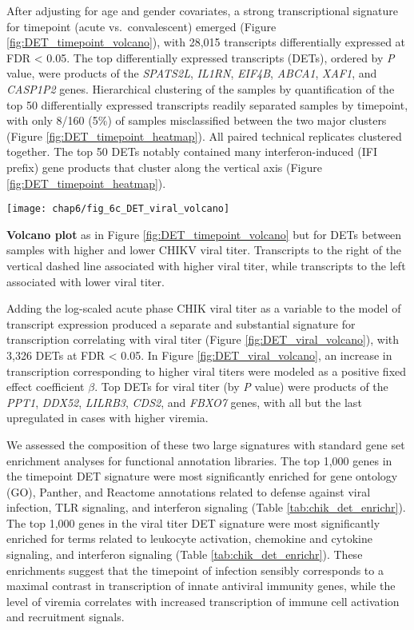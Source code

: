 After adjusting for age and gender covariates, a strong transcriptional signature for timepoint (acute vs.\ convalescent) emerged (Figure \ref{fig:DET_timepoint_volcano}), with 28,015 transcripts differentially expressed at FDR < 0.05. The top differentially expressed transcripts (DETs), ordered by \emph{P} value, were products of the \emph{SPATS2L}, \emph{IL1RN}, \emph{EIF4B}, \emph{ABCA1}, \emph{XAF1}, and \emph{CASP1P2} genes. Hierarchical clustering of the samples by quantification of the top 50 differentially expressed transcripts readily separated samples by timepoint, with only 8/160 (5\%) of samples misclassified between the two major clusters (Figure \ref{fig:DET_timepoint_heatmap}). All paired technical replicates clustered together. The top 50 DETs notably contained many interferon-induced (IFI prefix) gene products that cluster along the vertical axis (Figure \ref{fig:DET_timepoint_heatmap}).

\begin{marginfigure}[-3cm]
  \centering
  \texttt{[image: chap6/fig\_6c\_DET\_viral\_volcano]}
  \caption[Volcano plot of differentially expressed host transcripts for viremic load]{
  \textbf{Volcano plot} as in Figure \ref{fig:DET_timepoint_volcano} but for DETs between samples with higher and lower CHIKV viral titer. Transcripts to the right of the vertical dashed line associated with higher viral titer, while transcripts to the left associated with lower viral titer. 
  }
  \label{fig:DET_viral_volcano}
\end{marginfigure}

Adding the log-scaled acute phase CHIK viral titer as a variable to the model of transcript expression produced a separate and substantial signature for transcription correlating with viral titer (Figure \ref{fig:DET_viral_volcano}), with 3,326 DETs at FDR < 0.05. In Figure \ref{fig:DET_viral_volcano}, an increase in transcription corresponding to higher viral titers were modeled as a positive fixed effect coefficient $\beta$. Top DETs for viral titer (by \emph{P} value) were products of the \emph{PPT1}, \emph{DDX52}, \emph{LILRB3}, \emph{CDS2}, and \emph{FBXO7} genes, with all but the last upregulated in cases with higher viremia.

We assessed the composition of these two large signatures with standard gene set enrichment analyses for functional annotation libraries. The top 1,000 genes in the timepoint DET signature were most significantly enriched for gene ontology (GO), Panther, and Reactome annotations related to defense against viral infection, TLR signaling, and interferon signaling (Table \ref{tab:chik_det_enrichr}). The top 1,000 genes in the viral titer DET signature were most significantly enriched for terms related to leukocyte activation, chemokine and cytokine signaling, and interferon signaling (Table \ref{tab:chik_det_enrichr}). These enrichments suggest that the timepoint of infection sensibly corresponds to a maximal contrast in transcription of innate antiviral immunity genes, while the level of viremia correlates with increased transcription of immune cell activation and recruitment signals.

